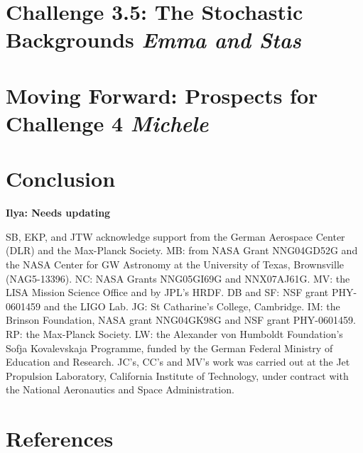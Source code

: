 \documentclass{iopart}
\newcommand{\ilya}[1]{{\color{red} \bf Ilya: #1}}
\begin{document}
\section{Challenge 3.5: The Stochastic Backgrounds {\it Emma and Stas}}

\section{Moving Forward: Prospects for Challenge 4 {\it Michele}}

\section{Conclusion}

\ack

\ilya{Needs updating}

SB, EKP, and JTW acknowledge support from the German Aerospace Center (DLR) and the Max-Planck Society.
MB: from NASA Grant NNG04GD52G and the NASA Center for GW Astronomy at the University of Texas, Brownsville (NAG5-13396). 
NC: NASA Grants NNG05GI69G and NNX07AJ61G.
MV: the LISA Mission Science Office and by JPL's HRDF.
DB and SF: NSF grant PHY-0601459 and the LIGO Lab.
JG: St Catharine's College, Cambridge.
IM: the Brinson Foundation, NASA grant NNG04GK98G and NSF grant PHY-0601459.
RP: the Max-Planck Society.
LW: the Alexander von Humboldt Foundation's Sofja Kovalevskaja Programme, funded by the German Federal Ministry of Education and Research.
JC's, CC's and MV's work was carried out at the Jet Propulsion Laboratory, California Institute of Technology, under contract with the National Aeronautics and Space Administration.


\section*{References}
\end{document}
